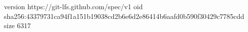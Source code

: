 version https://git-lfs.github.com/spec/v1
oid sha256:43379731ca94f1a151b19038cd2b6e6d2e86414b6aafd0b590f30429c7785cdd
size 6317
